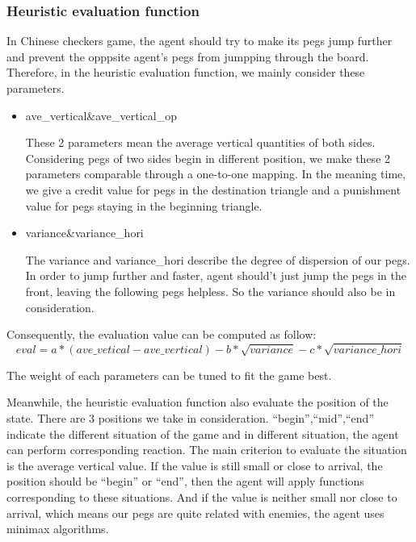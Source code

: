 \documentclass[aps,letterpaper,10pt]{revtex4}
\begin{document}
\subsubsection{Heuristic evaluation function}
In Chinese checkers game, the agent should try to make its pegs jump further and prevent the opppsite agent's pegs
from jumpping through the board. Therefore, in the heuristic evaluation function, we mainly consider these parameters.
\begin{itemize}
    \item ave\_vertical\&ave\_vertical\_op 

    These 2 parameters mean the average vertical quantities of both sides. Considering pegs of two sides begin in different 
    position, we make these 2 parameters comparable through a one-to-one mapping. In the meaning time, we give a credit value 
    for pegs in the destination triangle and a punishment value for pegs staying in the beginning triangle.
    \item variance\&variance\_hori

    The variance and variance\_hori describe the degree of dispersion of our pegs. In order to jump further and faster, agent should't just jump 
    the pegs in the front, leaving the following pegs helpless. So the variance should also be in consideration.
\end{itemize}
\vspace{3mm}
\par
Consequently, the evaluation value can be computed as follow:
\begin{equation}
    eval = a*(ave\_vetical-ave\_vertical) - b*\sqrt{variance} - c*\sqrt{variance\_hori}
\end{equation}
\par
The weight of each parameters can be tuned to fit the game best. \\
\par
Meanwhile, the heuristic evaluation function also evaluate the position of the state. There are 3 positions we take in consideration. ``begin'',``mid'',``end'' indicate 
the different situation of the game and in different situation, the agent can perform corresponding reaction. The main criterion to 
evaluate the situation is the average vertical value. If the value is still small or close to arrival, the position should be ``begin'' or ``end'', then the 
agent will apply functions corresponding to these situations. And if the value is neither small nor close to arrival, which means our 
pegs are quite related with enemies, the agent uses minimax algorithms.
\end{document}
